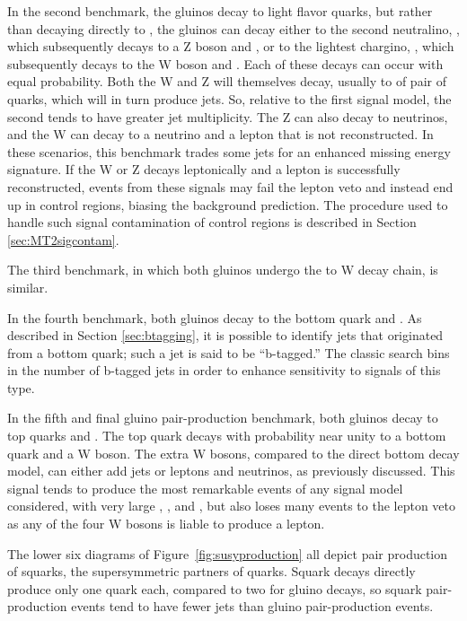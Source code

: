     In the second benchmark, the gluinos decay to light flavor quarks, but rather than decaying directly to \lsp, the gluinos can decay either to the second neutralino, \chitwo, which subsequently decays to a Z boson and \lsp, or to the lightest chargino, \chargino, which subsequently decays to the W boson and \lsp.
    Each of these decays can occur with equal probability.
    Both the W and Z will themselves decay, usually to of pair of quarks, which will in turn produce jets. 
    So, relative to the first signal model, the second tends to have greater jet multiplicity.
    The Z can also decay to neutrinos, and the W can decay to a neutrino and a lepton that is not reconstructed.
    In these scenarios, this benchmark trades some jets for an enhanced missing energy signature.
    If  the W or Z decays leptonically and a lepton is successfully reconstructed, events from these signals may fail the lepton veto and instead end up in control regions, biasing the background prediction.
    The procedure used to handle such signal contamination of control regions is described in Section \ref{sec:MT2sigcontam}.

    The third benchmark, in which both gluinos undergo the \chargino to W decay chain, is similar.

    In the fourth benchmark, both gluinos decay to the bottom quark and \lsp.
    As described in Section \ref{sec:btagging}, it is possible to identify jets that originated from a bottom quark; such a jet is said to be ``b-tagged.''
    The classic search bins in the number of b-tagged jets in order to enhance sensitivity to signals of this type.

    In the fifth and final gluino pair-production benchmark, both gluinos decay to top quarks and \lsp.
    The top quark decays with probability near unity to a bottom quark and a W boson.
    The extra W bosons, compared to the direct bottom decay model, can either add jets or leptons and neutrinos, as previously discussed.
    This signal tends to produce the most remarkable events of any signal model considered, with very large \Ht, \njet, and \nb, but also loses many events to the lepton veto as any of the four W bosons is liable to produce a lepton.

    The lower six diagrams of Figure~\ref{fig:susyproduction} all depict pair production of squarks, the supersymmetric partners of quarks.
    Squark decays directly produce only one quark each, compared to two for gluino decays, so squark pair-production events tend to have fewer jets than gluino pair-production events.

